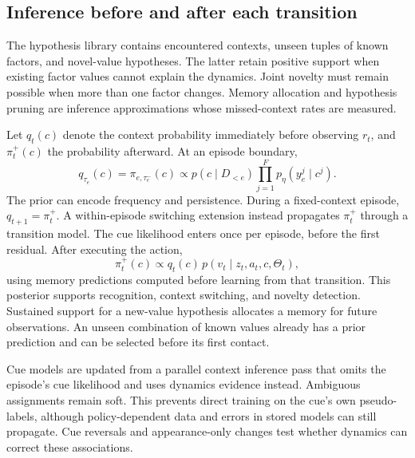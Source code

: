 \subsection{Inference before and after each transition}
The hypothesis library contains encountered contexts, unseen tuples of known factors, and novel-value hypotheses. The latter retain positive support when existing factor values cannot explain the dynamics. Joint novelty must remain possible when more than one factor changes. Memory allocation and hypothesis pruning are inference approximations whose missed-context rates are measured.

Let $q_t(c)$ denote the context probability immediately before observing $r_t$, and $\pi_t^+(c)$ the probability afterward. At an episode boundary,
\begin{equation}\label{eq:cueupdate}
 q_{\tau_e}(c)=\pi_{e,\tau_e^-}(c)
 \propto p(c\mid D_{<e})\prod_{j=1}^F p_\eta(y_e^j\mid c^j).
\end{equation}
The prior can encode frequency and persistence. During a fixed-context episode, $q_{t+1}=\pi_t^+$. A within-episode switching extension instead propagates $\pi_t^+$ through a transition model. The cue likelihood enters once per episode, before the first residual. After executing the action,
\begin{equation}\label{eq:dynamicsupdate}
 \pi_t^+(c)\propto q_t(c)\,p(v_t\mid z_t,a_t,c,\Theta_t),
\end{equation}
using memory predictions computed before learning from that transition. This posterior supports recognition, context switching, and novelty detection. Sustained support for a new-value hypothesis allocates a memory for future observations. An unseen combination of known values already has a prior prediction and can be selected before its first contact.

Cue models are updated from a parallel context inference pass that omits the episode's cue likelihood and uses dynamics evidence instead. Ambiguous assignments remain soft. This prevents direct training on the cue's own pseudo-labels, although policy-dependent data and errors in stored models can still propagate. Cue reversals and appearance-only changes test whether dynamics can correct these associations.

